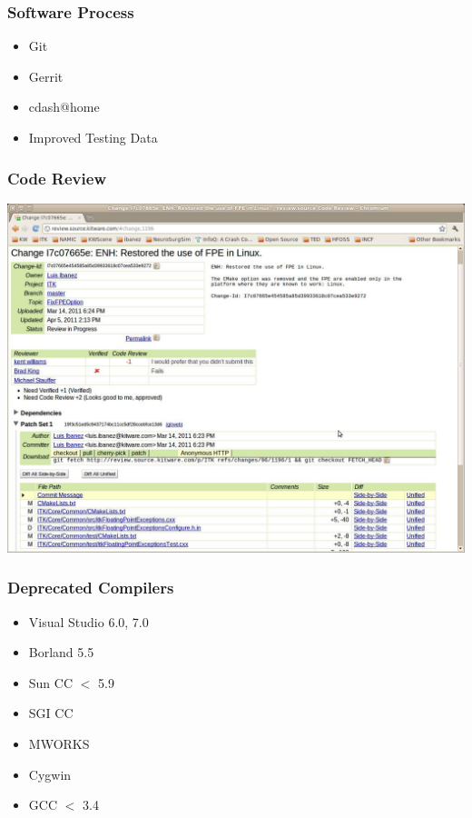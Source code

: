 





\begin{frame}
\frametitle{Software Process}
\Huge
\begin{itemize}
\item Git
\pause
\item Gerrit
\pause
\item cdash@home
\pause
\item Improved Testing Data
\end{itemize}
\end{frame}


{
\begin{frame}
  \frametitle{Code Review}
  \includegraphics[width=\textwidth,height=\paperheight]{../Art/ITKGerritScreenShot.jpg}
\end{frame}
}




\begin{frame}
\frametitle{Deprecated Compilers}
\Huge
\begin{itemize}
\item Visual Studio 6.0, 7.0
\pause
\item Borland 5.5
\pause
\item Sun CC $<$ 5.9
\pause
\item SGI CC
\pause
\item MWORKS
\pause
\item Cygwin
\pause
\item GCC $<$ 3.4
\end{itemize}
\end{frame}




